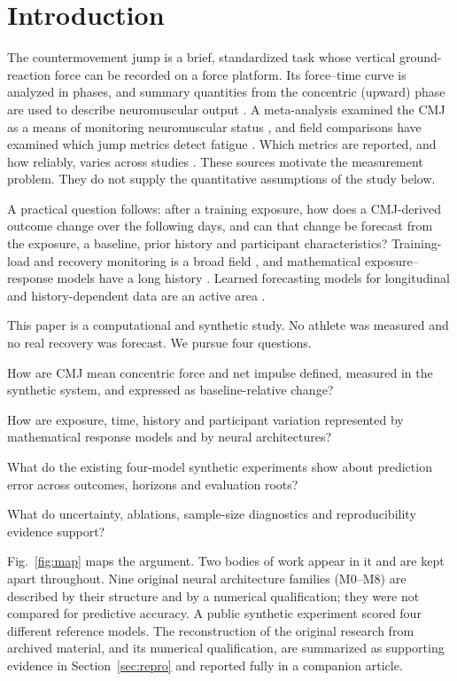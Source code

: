 \documentclass[12pt,a4paper]{article}
\newcommand{\Fig}[1]{Fig.~\ref{#1}}
\begin{document}
\section{Introduction}
The countermovement jump is a brief, standardized task whose vertical ground-reaction force can be recorded on a force platform. Its force--time curve is analyzed in phases, and summary quantities from the concentric (upward) phase are used to describe neuromuscular output \cite{Linthorne2001,McMahon2018,Cormie2011}. A meta-analysis examined the CMJ as a means of monitoring neuromuscular status \cite{Claudino2017}, and field comparisons have examined which jump metrics detect fatigue \cite{Gathercole2015}. Which metrics are reported, and how reliably, varies across studies \cite{V3R3,V3R4,Hopkins2000}. These sources motivate the measurement problem. They do not supply the quantitative assumptions of the study below.

A practical question follows: after a training exposure, how does a CMJ-derived outcome change over the following days, and can that change be forecast from the exposure, a baseline, prior history and participant characteristics? Training-load and recovery monitoring is a broad field \cite{Impellizzeri2019,Kellmann2018}, and mathematical exposure--response models have a long history \cite{Calvert1976,Busso2003}. Learned forecasting models for longitudinal and history-dependent data are an active area \cite{Lim2021,Che2018}.

This paper is a computational and synthetic study. No athlete was measured and no real recovery was forecast. We pursue four questions.
\begin{description}\setlength{\itemsep}{0pt}
\item[RQ1 Measurement.] How are CMJ mean concentric force and net impulse defined, measured in the synthetic system, and expressed as baseline-relative change?
\item[RQ2 Recovery modeling.] How are exposure, time, history and participant variation represented by mathematical response models and by neural architectures?
\item[RQ3 Prediction.] What do the existing four-model synthetic experiments show about prediction error across outcomes, horizons and evaluation roots?
\item[RQ4 Limitations.] What do uncertainty, ablations, sample-size diagnostics and reproducibility evidence support?
\end{description}
\Fig{fig:map} maps the argument. Two bodies of work appear in it and are kept apart throughout. Nine original neural architecture families (M0--M8) are described by their structure and by a numerical qualification; they were not compared for predictive accuracy. A public synthetic experiment scored four different reference models. The reconstruction of the original research from archived material, and its numerical qualification, are summarized as supporting evidence in Section~\ref{sec:repro} and reported fully in a companion article.
\end{document}
